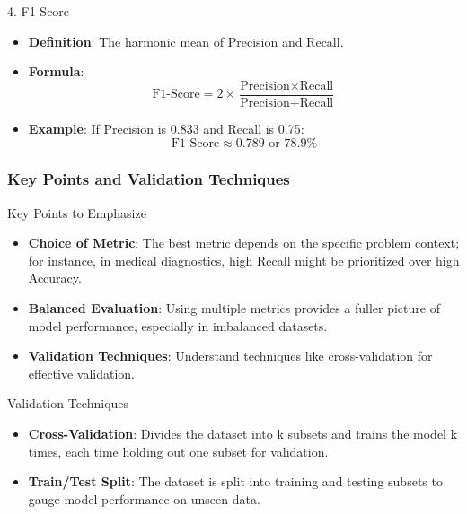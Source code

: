 \documentclass[aspectratio=169]{beamer}
\begin{document}
\begin{frame}[fragile]
    \begin{block}{4. F1-Score}
        \begin{itemize}
            \item \textbf{Definition}: The harmonic mean of Precision and Recall.
            \item \textbf{Formula}:
            \begin{equation}
                \text{F1-Score} = 2 \times \frac{\text{Precision} \times \text{Recall}}{\text{Precision} + \text{Recall}}
            \end{equation}
            \item \textbf{Example}: If Precision is 0.833 and Recall is 0.75:
            \begin{equation}
                \text{F1-Score} \approx 0.789 \text{ or } 78.9\%
            \end{equation}
        \end{itemize}
    \end{block}
\end{frame}

\begin{frame}[fragile]
    \frametitle{Key Points and Validation Techniques}
    \begin{block}{Key Points to Emphasize}
        \begin{itemize}
            \item \textbf{Choice of Metric}: The best metric depends on the specific problem context; for instance, in medical diagnostics, high Recall might be prioritized over high Accuracy.
            \item \textbf{Balanced Evaluation}: Using multiple metrics provides a fuller picture of model performance, especially in imbalanced datasets.
            \item \textbf{Validation Techniques}: Understand techniques like cross-validation for effective validation.
        \end{itemize}
    \end{block}

    \begin{block}{Validation Techniques}
        \begin{itemize}
            \item \textbf{Cross-Validation}: Divides the dataset into k subsets and trains the model k times, each time holding out one subset for validation.
            \item \textbf{Train/Test Split}: The dataset is split into training and testing subsets to gauge model performance on unseen data.
        \end{itemize}
    \end{block}
\end{frame}
\end{document}
